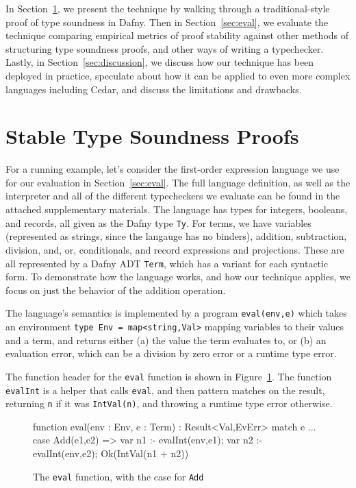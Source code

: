 \documentclass[sigplan,review,screen,anonymous]{acmart}
\begin{document}
In Section~\ref{sec:sts}, we present the technique by walking through a traditional-style proof of type soundness in Dafny.
Then in Section~\ref{sec:eval}, we evaluate the technique comparing empirical metrics of proof stability against other methods of structuring type soundness proofs, and other ways of writing a typechecker.
Lastly, in Section~\ref{sec:discussion}, we discuss how our technique has been deployed in practice, speculate about how it can be applied to even more complex languages including Cedar,
and discuss the limitations and drawbacks.


\section{Stable Type Soundness Proofs}
\label{sec:sts}
For a running example, let's consider the first-order expression language we
use for our evaluation in Section~\ref{sec:eval}. The full language definition, as well as the
interpreter and all of the different typecheckers we evaluate can be found in the attached supplementary materials. The language has
types for integers, booleans, and records, all given as the Dafny type
\texttt{Ty}.  For terms, we have variables (represented as strings, since the
langauge has no binders), addition, subtraction, division, and, or,
conditionals, and record expressions and projections. These are all represented
by a Dafny ADT \texttt{Term}, which has a variant for each syntactic form.
To demonstrate how the language works, and how our technique applies, we focus
on just the behavior of the addition operation.

The language's semantics is implemented by a program \texttt{eval(env,e)} which takes an environment \texttt{type
Env = map<string,Val>} mapping variables to their values and a term, and returns
either (a) the value the term evaluates to, or (b) an evaluation error, which can be a
division by zero error or a runtime type error.

The function header for the \texttt{eval} function is shown in Figure~\ref{fig:eval}.
The function \texttt{evalInt} is a helper that calls \texttt{eval}, and then pattern matches on the result,
returning \texttt{n} if it was \texttt{IntVal(n)}, and throwing a runtime type error otherwise.

\begin{figure}
\begin{dafny}
function eval(env : Env, e : Term) : Result<Val,EvErr>
{
  match e {
    ...
    case Add(e1,e2) =>
      var n1 :- evalInt(env,e1);
      var n2 :- evalInt(env,e2);
      Ok(IntVal(n1 + n2))
  }
}
  \end{dafny}
  \caption{The \texttt{eval} function, with the case for \texttt{Add}}
  \label{fig:eval}
\end{figure}
\end{document}
